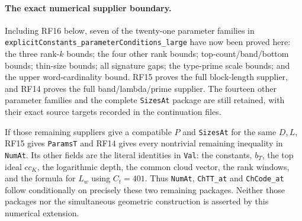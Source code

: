 \documentclass[11pt,a4paper]{article}
\numberwithin{equation}{section}
\theoremstyle{remark}\newtheorem{remark}[theorem]{Remark}
\begin{document}
\paragraph{The exact numerical supplier boundary.}
Including RF16 below, seven of the twenty-one parameter families in
\texttt{explicitConstants\_\allowbreak parameterConditions\_\allowbreak large} have now been
proved here: the three rank-$k$ bounds; the four other rank bounds;
top-count/band/bottom bounds; thin-size bounds; all signature gaps;
the type-prime scale bounds; and the upper word-cardinality bound.
RF15 proves the full block-length
supplier, and RF14 proves the full band/lambda/prime supplier.
The fourteen other parameter families and the complete
\texttt{SizesAt} package are still retained, with their exact source
targets recorded in the continuation files.

If those remaining suppliers give a compatible $P$ and
\texttt{SizesAt} for the same $D,L$, RF15 gives \texttt{ParamsT} and
RF14 gives every nontrivial remaining inequality in \texttt{NumAt}.
Its other fields are the literal identities in \texttt{Val}:
the constants, $b_T$, the top ideal $cc_K$, the logarithmic depth,
the common cloud vector, the rank windows, and the formula for $L_w$
using $C_t=401$. Thus \texttt{NumAt}, \texttt{ChTT\_\allowbreak at} and
\texttt{ChCode\_\allowbreak at} follow conditionally on precisely these two
remaining packages. Neither those packages nor the simultaneous
geometric construction is asserted by this numerical extension.
\end{document}
